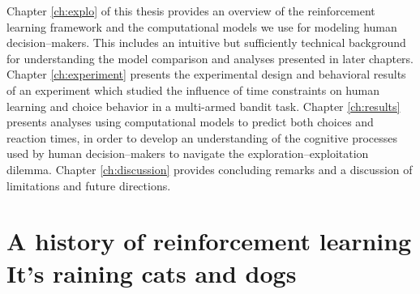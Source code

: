Chapter \ref{ch:explo} of this thesis provides an overview of the reinforcement learning framework and the computational models we use for modeling human decision--makers. This includes an intuitive but sufficiently technical background for understanding the model comparison and analyses presented in later chapters.
Chapter \ref{ch:experiment} presents the experimental design and behavioral results of an experiment which studied the influence of time constraints on human learning and choice behavior in a multi-armed bandit task. 
Chapter \ref{ch:results} presents analyses using computational models to predict both choices and reaction times, in order to develop an understanding of the cognitive processes used by human decision--makers to navigate the exploration--exploitation dilemma. Chapter \ref{ch:discussion} provides concluding remarks and a discussion of limitations and future directions. 

\section[A history of reinforcement learning]{A history of reinforcement learning\\ {\large It's raining cats and dogs}} 

